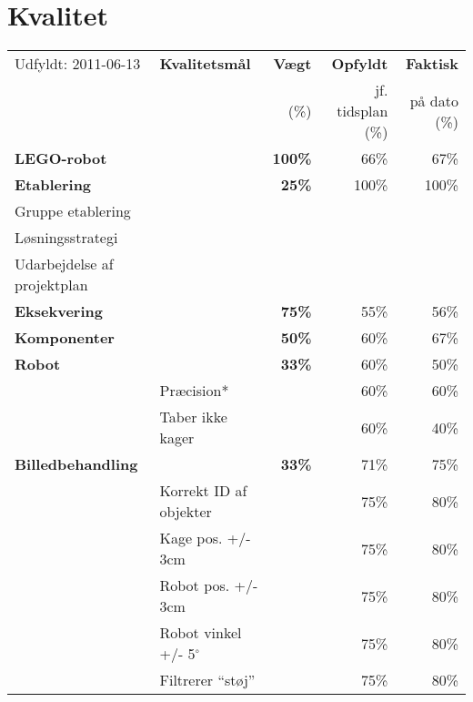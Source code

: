 \section{Kvalitet}
\begin{footnotesize}
\begin{center}
\begin{tabular}{l | l | r r r}
	\footnotesize{Udfyldt: 2011-06-13}	& \textbf{Kvalitetsmål} & \textbf{Vægt} & \textbf{Opfyldt} & \textbf{Faktisk}\\
	& & \footnotesize{(\%)}	& \footnotesize{jf. tidsplan (\%)}	& \footnotesize{på dato (\%)} \\
	\hline
	\textbf{LEGO-robot}
																&		& \textbf{100\%} & 66\% & 67\% \\
	\hline
	\hline
	\textbf{Etablering}
																&		& \textbf{25\%} 	& 	100\%	& 100\% \\
	\hspace*{0.3cm} Gruppe etablering
					 											&		&		&		& \\
	\hspace*{0.3cm} Løsningsstrategi
					 											&		&		&		& \\
	\hspace*{0.3cm} Udarbejdelse af projektplan 
																&		&		&		& \\
	\hline
	\textbf{Eksekvering}
																&		& \textbf{75\%}	& 55\% & 56\% \\		
	\hspace*{0.3cm}\textbf{Komponenter}
																&		& \textbf{50\%}		& 	60\% & 67\%\\
	\hspace*{0.3cm}\hspace*{0.3cm} \textbf{Robot}
																& 		& \textbf{33\%} 	& 	60\% & 50\% \\
	& Præcision* & & 60\% & 60\% \\
	& Taber ikke kager & & 60\% & 40\% \\
	\hspace*{0.3cm}\hspace*{0.3cm} \textbf{Billedbehandling}
																& & \textbf{33\%}		&	71\% & 	75\% \\
	& Korrekt ID af objekter & & 75\% & 80\% \\
	& Kage pos. +/- 3cm & & 75\% & 80\% \\
	& Robot pos. +/- 3cm & & 75\% & 80\% \\
	& Robot vinkel +/- 5$^\circ$ & & 75\% & 80\% \\
	& Filtrerer "`støj"' & & 75\% & 80\% \\

\end{tabular}
\end{center}
\end{footnotesize}
